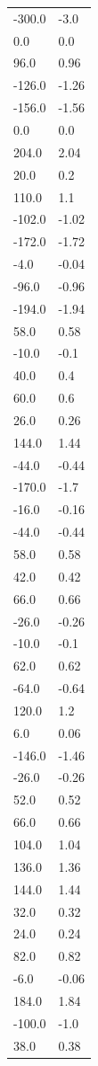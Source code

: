 \begin{longtable}{ll}
-300.0 & -3.0 \\
0.0 & 0.0 \\
96.0 & 0.96 \\
-126.0 & -1.26 \\
-156.0 & -1.56 \\
0.0 & 0.0 \\
204.0 & 2.04 \\
20.0 & 0.2 \\
110.0 & 1.1 \\
-102.0 & -1.02 \\
-172.0 & -1.72 \\
-4.0 & -0.04 \\
-96.0 & -0.96 \\
-194.0 & -1.94 \\
58.0 & 0.58 \\
-10.0 & -0.1 \\
40.0 & 0.4 \\
60.0 & 0.6 \\
26.0 & 0.26 \\
144.0 & 1.44 \\
-44.0 & -0.44 \\
-170.0 & -1.7 \\
-16.0 & -0.16 \\
-44.0 & -0.44 \\
58.0 & 0.58 \\
42.0 & 0.42 \\
66.0 & 0.66 \\
-26.0 & -0.26 \\
-10.0 & -0.1 \\
62.0 & 0.62 \\
-64.0 & -0.64 \\
120.0 & 1.2 \\
6.0 & 0.06 \\
-146.0 & -1.46 \\
-26.0 & -0.26 \\
52.0 & 0.52 \\
66.0 & 0.66 \\
104.0 & 1.04 \\
136.0 & 1.36 \\
144.0 & 1.44 \\
32.0 & 0.32 \\
24.0 & 0.24 \\
82.0 & 0.82 \\
-6.0 & -0.06 \\
184.0 & 1.84 \\
-100.0 & -1.0 \\
38.0 & 0.38 \\

\end{longtable}
